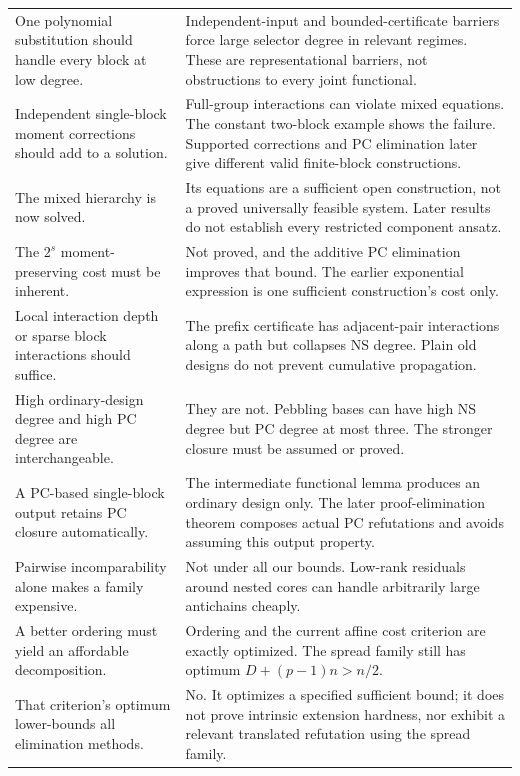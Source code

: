 \begin{longtable}{@{}L{0.29\textwidth}L{0.65\textwidth}@{}}
One polynomial substitution should handle every block at low degree. & Independent-input and bounded-certificate barriers force large selector degree in relevant regimes. These are representational barriers, not obstructions to every joint functional.\\
Independent single-block moment corrections should add to a solution. & Full-group interactions can violate mixed equations. The constant two-block example shows the failure. Supported corrections and PC elimination later give different valid finite-block constructions.\\
The mixed hierarchy is now solved. & Its equations are a sufficient open construction, not a proved universally feasible system. Later results do not establish every restricted component ansatz.\\
The $2^s$ moment-preserving cost must be inherent. & Not proved, and the additive PC elimination improves that bound. The earlier exponential expression is one sufficient construction's cost only.\\
Local interaction depth or sparse block interactions should suffice. & The prefix certificate has adjacent-pair interactions along a path but collapses NS degree. Plain old designs do not prevent cumulative propagation.\\
High ordinary-design degree and high PC degree are interchangeable. & They are not. Pebbling bases can have high NS degree but PC degree at most three. The stronger closure must be assumed or proved.\\
A PC-based single-block output retains PC closure automatically. & The intermediate functional lemma produces an ordinary design only. The later proof-elimination theorem composes actual PC refutations and avoids assuming this output property.\\
Pairwise incomparability alone makes a family expensive. & Not under all our bounds. Low-rank residuals around nested cores can handle arbitrarily large antichains cheaply.\\
A better ordering must yield an affordable decomposition. & Ordering and the current affine cost criterion are exactly optimized. The spread family still has optimum $D+(p-1)n>n/2$.\\
That criterion's optimum lower-bounds all elimination methods. & No. It optimizes a specified sufficient bound; it does not prove intrinsic extension hardness, nor exhibit a relevant translated refutation using the spread family.\\\bottomrule
\end{longtable}

